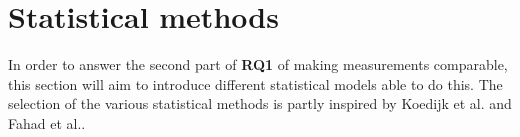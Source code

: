 \section{Statistical methods}\label{sec:stat}


In order to answer the second part of \textbf{RQ1} of making measurements comparable, this section will aim to introduce different statistical models able to do this. The selection of the various statistical methods is partly inspired by Koedijk et al.\cite{Koedijk2022diff} and Fahad et al.\cite{fahad2019comparative}.



